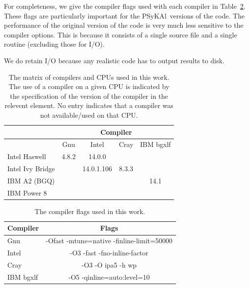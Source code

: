\documentclass[journal]{IEEEtran}
\newcommand{\psykal}{{PS}y{KA}l\ }
\begin{document}
For completeness, we give the compiler flags used with each compiler
in Table~\ref{TABLE_compiler_flags}. These flags are particularly
important for the \psykal versions of the code. The performance of the
original version of the code is very much less sensitive to the
compiler options. This is because it consists of a single source file
and a single routine (excluding those for I/O).

We do retain I/O because any realistic code has to output results to disk.

%
\begin{table}[!t]
\renewcommand{\arraystretch}{1.3}
\caption{The matrix of compilers and CPUs used in this work. The use
  of a compiler on a given CPU is indicated by the specification of
  the version of the compiler in the relevent element. No entry
  indicates that a compiler was not available/used on that CPU.}
\label{TABLE_compilers}
\centering
\begin{tabular}{|l|c|c|c|c|}
\hline
                 & \multicolumn{4}{c|}{Compiler}             \\
\hline
                 & Gnu   & Intel       & Cray    & IBM bgxlf\\
\hline
Intel Haswell    & 4.8.2 & 14.0.0      &         &          \\
Intel Ivy Bridge &       & 14.0.1.106  & 8.3.3   &          \\
IBM A2 (BGQ)     &       &             &         & 14.1     \\
IBM Power 8      &       &             &         &          \\
\hline
\end{tabular}
\end{table}

\begin{table}[!t]
\renewcommand{\arraystretch}{1.3}
\caption{The compiler flags used in this work.}
\label{TABLE_compiler_flags}
\centering
\begin{tabular}{l|c}
\hline
Compiler  &  Flags \\
\hline
Gnu       & -Ofast -mtune=native -finline-limit=50000    \\
Intel     & -O3 -fast -fno-inline-factor    \\
Cray      & -O3 -O ipa5 -h wp    \\
IBM bgxlf & -O5 -qinline=auto:level=10    \\
\hline
\end{tabular}
\end{table}
\end{document}
